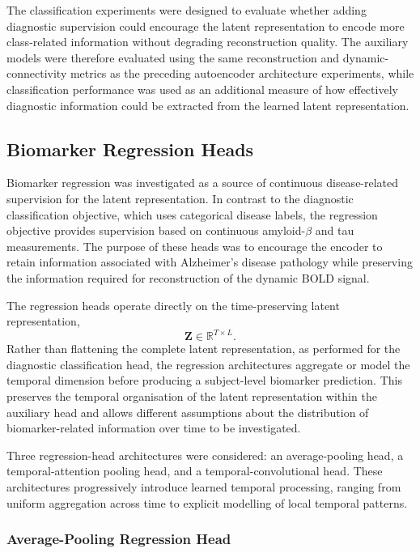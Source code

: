 The classification experiments were designed to evaluate whether adding
diagnostic supervision could encourage the latent representation to encode
more class-related information without degrading reconstruction quality.
The auxiliary models were therefore evaluated using the same reconstruction
and dynamic-connectivity metrics as the preceding autoencoder architecture
experiments, while classification performance was used as an additional
measure of how effectively diagnostic information could be extracted from
the learned latent representation.




\subsection{Biomarker Regression Heads}

Biomarker regression was investigated as a source of continuous
disease-related supervision for the latent representation. In contrast to
the diagnostic classification objective, which uses categorical disease
labels, the regression objective provides supervision based on continuous
amyloid-$\beta$ and tau measurements. The purpose of these heads was to
encourage the encoder to retain information associated with Alzheimer's
disease pathology while preserving the information required for
reconstruction of the dynamic BOLD signal.

The regression heads operate directly on the time-preserving latent
representation,
\[
    \mathbf{Z}\in\mathbb{R}^{T\times L}.
\]
Rather than flattening the complete latent representation, as performed for
the diagnostic classification head, the regression architectures aggregate
or model the temporal dimension before producing a subject-level biomarker
prediction. This preserves the temporal organisation of the latent
representation within the auxiliary head and allows different assumptions
about the distribution of biomarker-related information over time to be
investigated.

Three regression-head architectures were considered: an average-pooling
head, a temporal-attention pooling head, and a temporal-convolutional head.
These architectures progressively introduce learned temporal processing,
ranging from uniform aggregation across time to explicit modelling of local
temporal patterns.

\subsubsection{Average-Pooling Regression Head}

